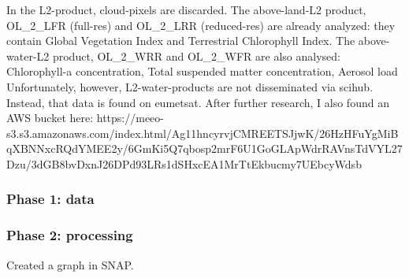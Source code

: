 In the L2-product, cloud-pixels are discarded.
The above-land-L2 product, OL\_2\_LFR (full-res) and OL\_2\_LRR (reduced-res) are already analyzed: they contain Global Vegetation Index and Terrestrial Chlorophyll Index.
The above-water-L2 product, OL\_2\_WRR and OL\_2\_WFR are also analysed: Chlorophyll-a concentration, Total suspended matter concentration, Aerosol load
Unfortunately, however, L2-water-products are not disseminated via scihub. Instead, that data is found on eumetsat. After further research, I also found an AWS bucket here: https://meeo-s3.s3.amazonaws.com/index.html/Ag11hncyrvjCMREETSJjwK/26HzHFuYgMiBqXBNNxcRQdYMEE2y/6GmKi5Q7qbosp2mrF6U1GoGLApWdrRAVnsTdVYL27Dzu/3dGB8bvDxnJ26DPd93LRs1dSHxcEA1MrTtEkbucmy7UEbcyWdsb

\subsubsection{Phase 1: data}

\subsubsection{Phase 2: processing}
Created a graph in SNAP.

